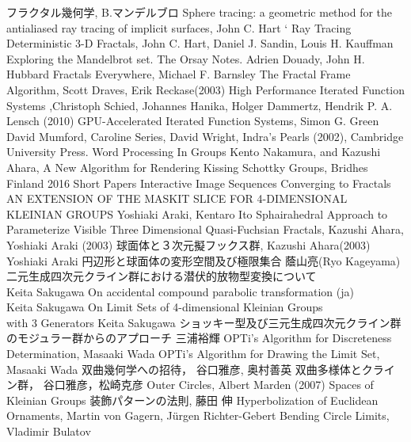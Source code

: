 {
\setlength{\baselineskip}{13pt}
\begin{thebibliography}{99}
        フラクタル幾何学, 
        B.マンデルブロ 
        Sphere tracing: a geometric method for the antialiased ray tracing of implicit surfaces, John C. Hart
`
         Ray Tracing Deterministic 3-D Fractals,
         John C. Hart, Daniel J. Sandin, Louis H. Kauffman
         Exploring the Mandelbrot set. The Orsay Notes.
         Adrien Douady, John H. Hubbard
         Fractals Everywhere, Michael F. Barnsley
        The Fractal Frame Algorithm, Scott Draves, Erik Reckase(2003)
         High Performance Iterated Function Systems
         ,Christoph Schied, Johannes Hanika, Holger Dammertz, Hendrik P. A. Lensch (2010)
         GPU-Accelerated Iterated Function Systems,
         Simon G. Green
         David Mumford, Caroline Series, David Wright, Indra's Pearls
         (2002), Cambridge University Press.
         Word Processing In Groups
         Kento Nakamura, and Kazushi Ahara, A New Algorithm for
         Rendering Kissing Schottky Groups,
         Bridhes Finland 2016 Short Papers
        Interactive Image Sequences Converging to Fractals
        AN EXTENSION OF THE MASKIT SLICE FOR 4-DIMENSIONAL KLEINIAN GROUPS
        Yoshiaki Araki, Kentaro Ito
        Sphairahedral Approach to Parameterize Visible Three Dimensional Quasi-Fuchsian Fractals,
        Kazushi Ahara, Yoshiaki Araki (2003)
        球面体と３次元擬フックス群,
        Kazushi Ahara(2003)
        Yoshiaki Araki
        円辺形と球面体の変形空間及び極限集合
        蔭山亮(Ryo Kageyama)
        二元生成四次元クライン群における潜伏的放物型変換について\\
        Keita Sakugawa
        On accidental compound parabolic transformation (ja)\\
        Keita Sakugawa
        On Limit Sets of 4-dimensional Kleinian Groups\\
with 3 Generators
        Keita Sakugawa
        ショッキー型及び三元生成四次元クライン群のモジュラー群からのアプローチ
        三浦裕輝
        OPTi's Algorithm for Discreteness Determination,
        Masaaki Wada
        OPTi's Algorithm for Drawing the Limit Set,
        Masaaki Wada
        双曲幾何学への招待，
        谷口雅彦, 奥村善英
        双曲多様体とクライン群，
        谷口雅彦，松崎克彦
        Outer Circles, Albert Marden (2007)
        Spaces of Kleinian Groups
        装飾パターンの法則,
        藤田 伸
        Hyperbolization of Euclidean Ornaments,
        Martin von Gagern, Jürgen Richter-Gebert
        Bending Circle Limits,
        Vladimir Bulatov
\end{thebibliography}
}